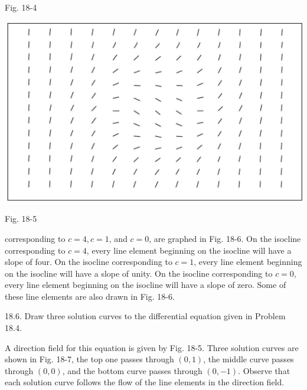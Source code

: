 \documentclass[10pt]{article}
\begin{document}
Fig. 18-4

\begin{center}
\includegraphics[max width=\textwidth]{2024_04_03_5bb5b4275a64cb9887d1g-179(1)}
\end{center}

Fig. 18-5

corresponding to $c=4, c=1$, and $c=0$, are graphed in Fig. 18-6. On the isocline corresponding to $c=4$, every line element beginning on the isocline will have a slope of four. On the isocline corresponding to $c=1$, every line element beginning on the isocline will have a slope of unity. On the isocline corresponding to $c=0$, every line element beginning on the isocline will have a slope of zero. Some of these line elements are also drawn in Fig. 18-6.

18.6. Draw three solution curves to the differential equation given in Problem 18.4.

A direction field for this equation is given by Fig. 18-5. Three solution curves are shown in Fig. 18-7, the top one passes through $(0,1)$, the middle curve passes through $(0,0)$, and the bottom curve passes through $(0,-1)$. Observe that each solution curve follows the flow of the line elements in the direction field.
\end{document}
